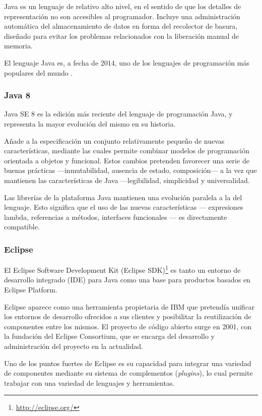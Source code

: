 Java es un lenguaje de relativo alto nivel, en el sentido de que los detalles de representación no son accesibles al programador.
Incluye una administración automática del almacenamiento de datos en forma del recolector de basura, diseñado para evitar los problemas relacionados con la liberación manual de memoria.

El lenguaje Java es, a fecha de 2014, uno de los lenguajes de programación más populares del mundo \cite{website:tiobe}.

\subsubsection{Java 8}
Java SE 8 es la edición más reciente del lenguaje de programación Java, y representa la mayor evolución del mismo en su historia.

Añade a la especificación un conjunto relativamente pequeño de nuevas características, mediante las cuales permite combinar modelos de programación orientada a objetos y funcional.
Estos cambios pretenden favorecer una serie de buenas prácticas ---inmutabilidad, ausencia de estado, composición--- a la vez que mantienen las características de Java ---legibilidad, simplicidad y universalidad.

Las librerías de la plataforma Java mantienen una evolución paralela a la del lenguaje.
Esto significa que el uso de las nuevas características --- expresiones lambda, referencias a métodos, interfaces funcionales --- es directamente compatible\cite{jls8}.

\subsubsection{Eclipse}
El Eclipse Software Development Kit (Eclipse SDK)\footnote{\url{http://eclipse.org/}} es tanto un entorno de desarrollo integrado (IDE) para Java como una base para productos basados en Eclipse Platform.

Eclipse aparece como una herramienta propietaria de IBM que pretendía unificar los entornos de desarrollo ofrecidos a sus clientes y posibilitar la reutilización de componentes entre los mismos.
El proyecto de código abierto surge en 2001, con la fundación del Eclipse Consortium, que se encarga del desarrollo y administración del proyecto en la actualidad\cite{website:eclipseFAQ}.

Uno de los puntos fuertes de Eclipse es su capacidad para integrar una variedad de componentes mediante su sistema de complementos (\emph{plugins}), lo cual permite trabajar con una variedad de lenguajes y herramientas.

